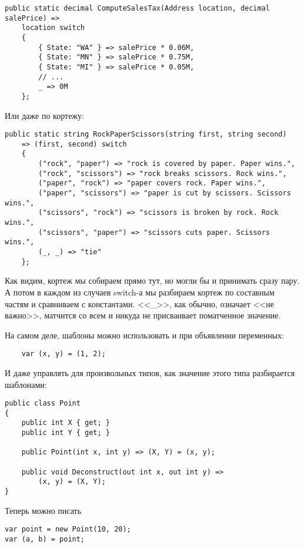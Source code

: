 \documentclass[a5paper]{article}
\begin{document}
\begin{verbatim}
public static decimal ComputeSalesTax(Address location, decimal salePrice) =>
    location switch
    {
        { State: "WA" } => salePrice * 0.06M,
        { State: "MN" } => salePrice * 0.75M,
        { State: "MI" } => salePrice * 0.05M,
        // ...
        _ => 0M
    };
\end{verbatim}

Или даже по кортежу:

\begin{verbatim}
public static string RockPaperScissors(string first, string second)
    => (first, second) switch
    {
        ("rock", "paper") => "rock is covered by paper. Paper wins.",
        ("rock", "scissors") => "rock breaks scissors. Rock wins.",
        ("paper", "rock") => "paper covers rock. Paper wins.",
        ("paper", "scissors") => "paper is cut by scissors. Scissors wins.",
        ("scissors", "rock") => "scissors is broken by rock. Rock wins.",
        ("scissors", "paper") => "scissors cuts paper. Scissors wins.",
        (_, _) => "tie"
    };
\end{verbatim}

Как видим, кортеж мы собираем прямо тут, но могли бы и принимать сразу пару. А потом в каждом из случаев switch-а мы разбираем кортеж по составным частям и сравниваем с константами. <<\_>>, как обычно, означает <<не важно>>, матчится со всем и никуда не присваивает поматченное значение.

На самом деле, шаблоны можно использовать и при объявлении переменных:

\begin{verbatim}
    var (x, y) = (1, 2);
\end{verbatim}

И даже управлять для произвольных типов, как значение этого типа разбирается шаблонами:

\begin{verbatim}
public class Point
{
    public int X { get; }
    public int Y { get; }

    public Point(int x, int y) => (X, Y) = (x, y);

    public void Deconstruct(out int x, out int y) =>
        (x, y) = (X, Y);
}
\end{verbatim}

Теперь можно писать

\begin{verbatim}
var point = new Point(10, 20);
var (a, b) = point;
\end{verbatim}
\end{document}

